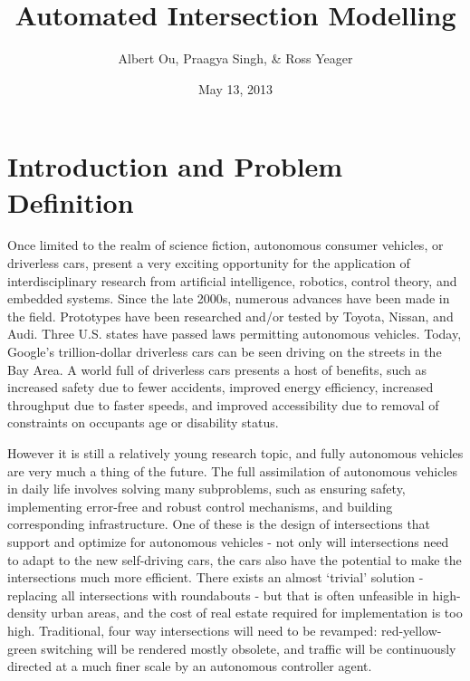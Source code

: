 \documentclass[10pt]{article}
\title{Automated Intersection Modelling}
\author{Albert Ou, Praagya Singh, & Ross Yeager}
\date{May 13, 2013}
\begin{document}
\maketitle


\section{Introduction and Problem Definition}

Once limited to the realm of science fiction, autonomous consumer vehicles, or driverless cars, present a very exciting opportunity for the application of interdisciplinary research from artificial intelligence, robotics, control theory, and embedded systems. Since the late 2000s, numerous advances have been made in the field. Prototypes have been researched and/or tested by Toyota, Nissan, and Audi. Three U.S. states have passed laws permitting autonomous vehicles. Today, Google’s trillion-dollar driverless cars can be seen driving on the streets in the Bay Area. A world full of driverless cars presents a host of benefits, such as increased safety due to fewer accidents, improved energy efficiency, increased throughput due to faster speeds, and improved accessibility due to removal of constraints on occupants age or disability status.

However it is still a relatively young research topic, and fully autonomous vehicles are very much a thing of the future. The full assimilation of autonomous vehicles in daily life involves solving many subproblems, such as ensuring safety, implementing error-free and robust control mechanisms, and building corresponding infrastructure. One of these is the design of intersections that support and optimize for autonomous vehicles - not only will intersections need to adapt to the new self-driving cars, the cars also have the potential to make the intersections much more efficient. There exists an almost ‘trivial’ solution - replacing all intersections with roundabouts - but that is often unfeasible in high-density urban areas, and the cost of real estate required for implementation is too high. Traditional, four way intersections will need to be revamped: red-yellow-green switching will be rendered mostly obsolete, and traffic will be continuously directed at a much finer scale by an autonomous controller agent.
\end{document}
